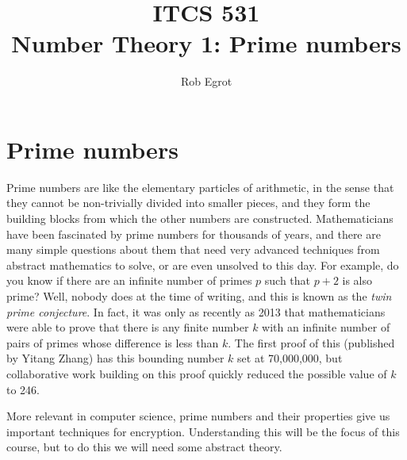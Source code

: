 \documentclass{article}
\title{ITCS 531 \\Number Theory 1: Prime numbers}
\author{Rob Egrot}
\date{}
\theoremstyle{plain}
\begin{document}
\maketitle

\section{Prime numbers}
Prime numbers are like the elementary particles of arithmetic, in the sense that they cannot be non-trivially divided into smaller pieces, and they form the building blocks from which the other numbers are constructed. Mathematicians have been fascinated by prime numbers for thousands of years, and there are many simple questions about them that need very advanced techniques from abstract mathematics to solve, or are even unsolved to this day. For example, do you know if there are an infinite number of primes $p$ such that $p+2$ is also prime? Well, nobody does at the time of writing, and this is known as the \emph{twin prime conjecture}. In fact, it was only as recently as 2013 that mathematicians were able to prove that there is any finite number $k$ with an infinite number of pairs of primes whose difference is less than $k$. The first proof of this (published by Yitang Zhang) has this bounding number $k$ set at 70,000,000, but collaborative work building on this proof quickly reduced the possible value of $k$ to 246.

More relevant in computer science, prime numbers and their properties give us important techniques for encryption. Understanding this will be the focus of this course, but to do this we will need some abstract theory. 
\end{document}
